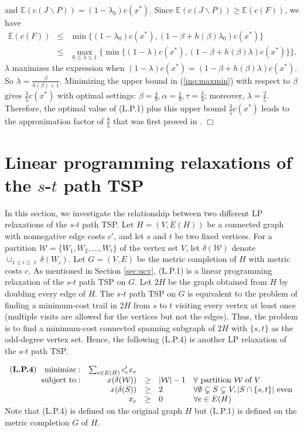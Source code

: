 \documentclass[11pt]{article}
\newcommand{\qed}{\hspace*{\fill}$\Box$}
\newenvironment{proof}[1][Proof. ]{\noindent {\bf #1 }}{\qed}
\begin{document}
\begin{proof}
and $\mathbb{E}(c(J\backslash P))=(1-\lambda_0)c(x^*)$. Since $\mathbb{E}(c(J\backslash P))\geq \mathbb{E}(c(F))$, we have
\begin{eqnarray}\label{inq:maxmin}
\mathbb{E}(c(F))&\leq& \min \{(1-\lambda_0)c(x^*), (1-\beta+h(\beta)\lambda_0) c(x^*)\} \nonumber \\
                &\leq& \max_{0\leq \lambda \leq 1} \{\min \{(1-\lambda)c(x^*), (1-\beta+h(\beta)\lambda) c(x^*) \}\}.
\end{eqnarray}
$\lambda$ maximizes the expression when $(1-\lambda)c(x^*)=(1-\beta+h(\beta)\lambda)c(x^*)$. So $\lambda=\frac{\beta}{h(\beta)+1}$. Minimizing
the upper bound in (\ref{inq:maxmin}) with respect to $\beta$ gives $\frac{3}{5}c(x^*)$ with optimal settings:
 $\beta=\frac{4}{9}, \alpha=\frac{1}{9}, \tau=\frac{3}{4}$; moreover, $\lambda=\frac{2}{5}$.
Therefore, the optimal value of (L.P.1) plus this upper bound $\frac{3}{5}c(x^*)$ leads to
the approximation factor of
$\frac{8}{5}$ that was first proved in \cite{sebo13}.
\end{proof}




\section{Linear programming relaxations of the $s$-$t$ path TSP}\label{sec:LPs}

In this section, we investigate the relationship between two different LP
relaxations of the $s$-$t$ path TSP. Let $H=(V, E(H))$ be a connected
graph with nonnegative edge costs $c'$, and
let $s$ and $t$ be two fixed vertices.
For a partition $\mathcal{W}=\{W_1, W_2, \ldots, W_{\ell}\}$ of
the vertex set $V$,
let $\delta(\mathcal{W})$ denote $\cup_{1\leq i\leq \ell}\delta(W_i)$.
Let $G=(V, E)$ be the metric completion of $H$ with metric costs $c$.
As mentioned in Section \ref{sec:ucv}, (L.P.1) is a linear
programming relaxation of the $s$-$t$ path TSP on $G$.  Let $2H$
be the graph obtained from $H$ by doubling every edge of $H$. The
$s$-$t$ path TSP on $G$ is equivalent to
the problem of finding a minimum-cost trail in $2H$ from $s$ to $t$
visiting every vertex at least once (multiple visits are allowed for the vertices but not the edges).
Thus, the problem is to find a minimum-cost connected
spanning subgraph of $2H$ with $\{s,t\}$ as the odd-degree vertex set.
Hence, the following (L.P.4) is another LP relaxation of
the $s$-$t$ path TSP.

\medskip
$
\begin{array}{rrcll}
\hbox{({\bf L.P.4})}\quad  {\rm minimize}: & \sum_{e \in E(H)} c'_ex_e & & \\
{\rm subject~to}: & x(\delta(\mathcal{W})) & \geq & |\mathcal{W}|-1 & \forall \mbox{ partition } \mathcal{W} \mbox{ of } V \\
& x(\delta(S)) & \geq & 2 & \forall \emptyset \subsetneq S \subsetneq V, |S \cap \{s, t\}| \mbox{ even } \\
& x_e & \geq  & 0 & \forall e \in E(H)
\end{array}
$
Note that (L.P.4) is defined on the original graph $H$ but (L.P.1)
is defined on the metric completion $G$ of $H$.
\end{document}

